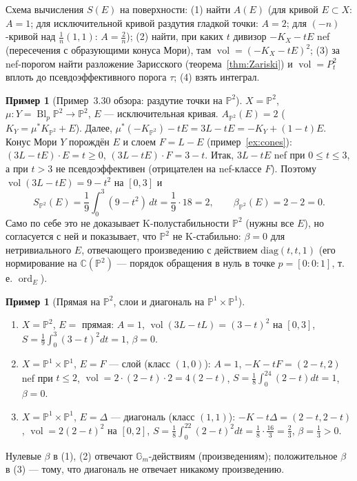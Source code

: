 \documentclass[11pt,a4paper]{article}
\theoremstyle{plain}
\theoremstyle{definition}
\newtheorem{example}[theorem]{Пример}
\theoremstyle{remark}
\renewcommand{\C}{\mathbb{C}}
\newcommand{\PP}{\mathbb{P}}
\newcommand{\Gm}{\mathbb{G}_m}
\DeclareMathOperator{\ord}{ord}
\DeclareMathOperator{\Bl}{Bl}
\DeclareMathOperator{\vol}{vol}
\begin{document}
Схема вычисления $S(E)$ на поверхности: (1) найти $A(E)$ (для кривой $E\subset X$: $A=1$; для
исключительной кривой раздутия гладкой точки: $A=2$; для $(-n)$-кривой над $\frac1n(1,1)$:
$A=\frac2n$); (2) найти, при каких $t$ дивизор $-K_X-tE$ nef (пересечения с образующими конуса
Мори), там $\vol=(-K_X-tE)^2$; (3) за nef-порогом найти разложение Зарисского
(теорема~\ref{thm:Zariski}) и $\vol=P_t^2$ вплоть до псевдоэффективного порога $\tau$; (4) взять
интеграл.

\begin{example}[Пример~3.30 обзора: раздутие точки на $\PP^2$]\label{ex:beta-P2-point}
$X=\PP^2$, $\mu\colon Y=\Bl_p\PP^2\to\PP^2$, $E$ --- исключительная кривая. $A_{\PP^2}(E)=2$
($K_Y=\mu^*K_{\PP^2}+E$). Далее, $\mu^*(-K_{\PP^2})-tE=3L-tE=-K_Y+(1-t)E$. Конус Мори $Y$ порождён
$E$ и слоем $F=L-E$ (пример~\ref{ex:cones}): $(3L-tE)\cdot E=t\ge0$, $(3L-tE)\cdot F=3-t$. Итак,
$3L-tE$ nef при $0\le t\le3$, а при $t>3$ не псевдоэффективен (отрицателен на nef-классе $F$).
Поэтому $\vol(3L-tE)=9-t^2$ на $[0,3]$ и
\[
S_{\PP^2}(E)=\frac19\int_0^3(9-t^2)\,dt=\frac19\cdot18=2,\qquad\beta_{\PP^2}(E)=2-2=0 .
\]
Само по себе это не доказывает K-полустабильности $\PP^2$ (нужны все $E$), но согласуется с ней
и показывает, что $\PP^2$ не K-стабильно: $\beta=0$ для нетривиального $E$, отвечающего
произведению с действием $\mathrm{diag}(t,t,1)$ (его нормирование на $\C(\PP^2)$ --- порядок
обращения в нуль в точке $p=[0:0:1]$, т.\,е. $\ord_E$).
\end{example}

\begin{example}[Прямая на $\PP^2$, слои и диагональ на $\PP^1\times\PP^1$]
\begin{enumerate}
\item $X=\PP^2$, $E=$ прямая: $A=1$, $\vol(3L-tL)=(3-t)^2$ на $[0,3]$, $S=\frac19\int_0^3(3-t)^2dt=1$,
$\beta=0$.
\item $X=\PP^1\times\PP^1$, $E=F$ --- слой (класс $(1,0)$): $A=1$, $-K-tF=(2-t,2)$ nef при
$t\le2$, $\vol=2\cdot(2-t)\cdot2=4(2-t)$, $S=\frac18\int_0^24(2-t)dt=1$, $\beta=0$.
\item $X=\PP^1\times\PP^1$, $E=\Delta$ --- диагональ (класс $(1,1)$): $-K-t\Delta=(2-t,2-t)$,
$\vol=2(2-t)^2$ на $[0,2]$, $S=\frac18\int_0^22(2-t)^2dt=\frac18\cdot\frac{16}3=\frac23$,
$\beta=\frac13>0$.
\end{enumerate}
Нулевые $\beta$ в (1), (2) отвечают $\Gm$-действиям (произведениям); положительное $\beta$ в (3)
--- тому, что диагональ не отвечает никакому произведению.
\end{example}
\end{document}
